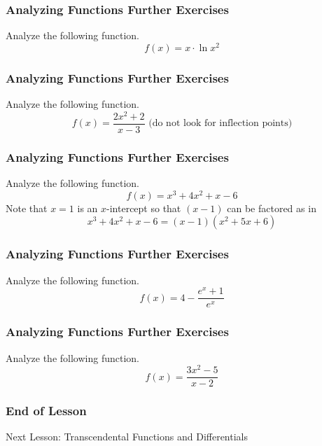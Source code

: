 \documentclass[xcolor=dvipsnames]{beamer}
\begin{document}
\begin{frame}
  \frametitle{Analyzing Functions Further Exercises}
{\ubung} Analyze the following function.
\begin{equation}
  \label{eq:uufiexah}
f(x)=x\cdot\ln{}x^{2}
\end{equation}
\end{frame}

\begin{frame}
  \frametitle{Analyzing Functions Further Exercises}
{\ubung} Analyze the following function.
\begin{equation}
  \label{eq:opeemuix}
f(x)=\frac{2x^{2}+2}{x-3}\mbox{ (do not look for inflection points)}
\end{equation}
\end{frame}

\begin{frame}
  \frametitle{Analyzing Functions Further Exercises}
{\ubung} Analyze the following function.
\begin{equation}
  \label{eq:oisheith}
f(x)=x^{3}+4x^{2}+x-6
\end{equation}
Note that $x=1$ is an $x$-intercept so that $(x-1)$ can be factored as
in
\begin{equation}
  \label{eq:xohhafoe}
x^{3}+4x^{2}+x-6=(x-1)(x^{2}+5x+6)
\end{equation}
\end{frame}

\begin{frame}
  \frametitle{Analyzing Functions Further Exercises}
{\ubung} Analyze the following function.
\begin{equation}
  \label{eq:ahkeique}
  f(x)=4-\frac{e^{x}+1}{e^{x}}
\end{equation}
\end{frame}

\begin{frame}
  \frametitle{Analyzing Functions Further Exercises}
{\ubung} Analyze the following function.
\begin{equation}
  \label{eq:mohsixox}
  f(x)=\frac{3x^{2}-5}{x-2}
\end{equation}
\end{frame}

\begin{frame}
  \frametitle{End of Lesson}
Next Lesson: Transcendental Functions and Differentials
\end{frame}
\end{document}
